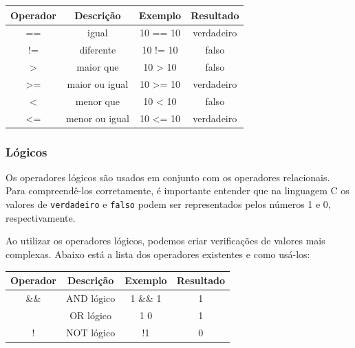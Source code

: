 \begin{center}
    \begin{tabular}{|c|c|c|c|}
        \hline
        Operador & Descrição & Exemplo & Resultado \\
        \hline
        == & igual & 10 == 10 & verdadeiro \\
        \hline
        != & diferente & 10 != 10 & falso \\
        \hline
        \textgreater{} & maior que & 10 \textgreater{} 10 & falso \\
        \hline
        \textgreater{}= & maior ou igual & 10 \textgreater{}= 10 & verdadeiro \\
        \hline
        \textless{} & menor que & 10 \textless{} 10 & falso\\
        \hline
        \textless{}= & menor ou igual & 10 \textless{}= 10 & verdadeiro \\
        \hline
    \end{tabular}
\end{center}

\subsubsection{Lógicos}

Os operadores lógicos são usados em conjunto com os operadores relacionais. 
Para compreendê-los corretamente, é importante entender que na linguagem C 
os valores de \texttt{verdadeiro} e \texttt{falso} podem ser representados 
pelos números 1 e 0, respectivamente.

Ao utilizar os operadores lógicos, podemos criar verificações de valores 
mais complexas. Abaixo está a lista dos operadores existentes e como usá-los:

\begin{center}
    \begin{tabular}{|c|c|c|c|}
        \hline
        Operador & Descrição & Exemplo & Resultado \\
        \hline
        \&\& & AND lógico & 1 \&\& 1 & 1 \\
        \hline
        \textbar{}\textbar{} & OR lógico & 1 \textbar{}\textbar{} 0 & 1 \\
        \hline
        ! & NOT lógico & !1 & 0 \\
        \hline
    \end{tabular}
\end{center}

